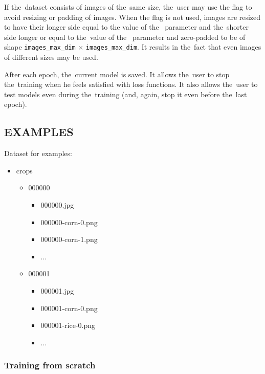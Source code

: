 If the~dataset consists of images of the~same size, the~user may use the
 flag to avoid resizing or padding of images. When the
flag is not used, images are resized to have their longer side equal to the
value of the~ parameter and the~shorter
side longer or equal to the~value of the~
parameter and zero-padded to be of shape \verb|images_max_dim| $\times$
\verb|images_max_dim|. It results in the~fact that even images of different
sizes may be used. 

After each epoch, the~current model is saved. It allows the~user to stop
the~training when he feels satisfied with loss functions. It also allows
the~user to test models even during the~training (and, again, stop it even
before the~last epoch). 

\subsection*{EXAMPLES}
Dataset for examples: 

\liststyleLii
\begin{itemize}
\item crops 

\begin{itemize}
\item 000000 

\begin{itemize}
\item 000000.jpg 
\item 000000-corn-0.png 
\item 000000-corn-1.png 
\item ... 
\end{itemize}
\item 000001 

\begin{itemize}
\item 000001.jpg 
\item 000001-corn-0.png 
\item 000001-rice-0.png 
\item ... 
\end{itemize}
\end{itemize}
\end{itemize}

\subsubsection*{Training from scratch}

